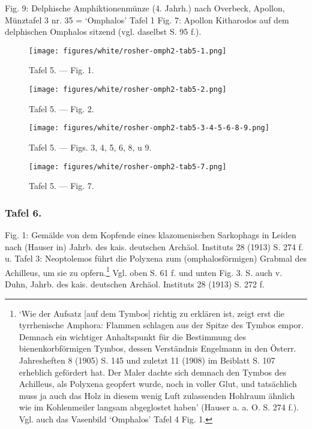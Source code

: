 \documentclass[a4paper, 11pt, oneside]{article}
\begin{document}
Fig. 9: Delphische Amphiktionenmünze (4. Jahrh.) nach Overbeck, Apollon, Münztafel 3 nr. 35 = `Omphalos' Tafel 1 Fig. 7: Apollon Kitharodos auf dem delphischen Omphalos sitzend (vgl. daselbst S. 95 f.).
\clearpage
\vspace*{\fill}
\begin{figure}[H]
\centering
\texttt{[image: figures/white/rosher-omph2-tab5-1.png]}
\caption{Tafel 5. --- Fig. 1.}
\end{figure}
\vspace*{\fill}
\clearpage
\vspace*{\fill}
\begin{figure}[H]
\centering
\texttt{[image: figures/white/rosher-omph2-tab5-2.png]}
\caption{Tafel 5. --- Fig. 2.}
\end{figure}
\vspace*{\fill}
\clearpage
\vspace*{\fill}
\begin{figure}[H]
\centering
\texttt{[image: figures/white/rosher-omph2-tab5-3-4-5-6-8-9.png]}
\caption{Tafel 5. --- Figs. 3, 4, 5, 6, 8, u 9.}
\end{figure}
\vspace*{\fill}
\clearpage
\vspace*{\fill}
\begin{figure}[H]
\centering
\texttt{[image: figures/white/rosher-omph2-tab5-7.png]}
\caption{Tafel 5. --- Fig. 7.}
\end{figure}
\vspace*{\fill}
\clearpage
\subsubsection{Tafel 6.}

Fig. 1: Gemälde von dem Kopfende eines klazomenischen Sarkophags in Leiden nach (Hauser in) Jahrb. des kais. deutschen Archäol. Instituts 28 (1913) S. 274 f. u. Tafel 3: Neoptolemos führt die Polyxena zum (omphalosförmigen) Grabmal des Achilleus, um sie zu opfern.\footnote{`Wie der Aufsatz [auf dem Tymbos] richtig zu erklären ist, zeigt erst die tyrrhenische Amphora: Flammen schlagen aus der Spitze des Tymbos empor. Demnach ein wichtiger Anhaltspunkt für die Bestimmung des bienenkorbförmigen Tymbos, dessen Verständnis Engelmann in den Österr. Jahresheften 8 (1905) S. 145 und zuletzt 11 (1908) im Beiblatt S. 107 erheblich gefördert hat. Der Maler dachte sich demnach den Tymbos des Achilleus, als Polyxena geopfert wurde, noch in voller Glut, und tatsächlich muss ja auch das Holz in diesem wenig Luft zulassenden Hohlraum ähnlich wie im Kohlenmeiler langsam abgeglostet haben' (Hauser a. a. O. S. 274 f.). Vgl. auch das Vasenbild `Omphalos' Tafel 4 Fig. 1.} Vgl. oben S. 61 f. und unten Fig. 3. S. auch v. Duhn, Jahrb. des kais. deutschen Archäol. Instituts 28 (1913) S. 272 f.
\end{document}
